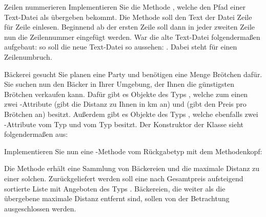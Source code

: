 \documentclass{../tuda-exercise}
\begin{document}
  \begin{task}[credit = \stars{2}{3}]{Zeilen nummerieren}
    Implementieren Sie die Methode , welche den
    Pfad einer Text-Datei als  übergeben bekommt. Die Methode soll den Text
    der Datei Zeile für Zeile einlesen. Beginnend ab der ersten Zeile soll dann in jeder zweiten
    Zeile nun die Zeilennummer eingefügt werden. War die alte Text-Datei folgendermaßen
    aufgebaut: \code{\textcolor{stringcolor}{"'Row1 \(\backslash\)n Row2"'}} so soll die neue
    Text-Datei so aussehen: \code{\textcolor{stringcolor}{"'1 Row1 \(\backslash\)n 2 Row2"'}}. Dabei steht
    \code{\textcolor{stringcolor}{"'\(\backslash\)n"'}} für einen Zeilenumbruch.

    \begin{solution}
      
    \end{solution}
  \end{task}

  \clearpage

  \begin{task}[credit = \stars{3}{3}]{Bäckerei gesucht}
    Sie planen eine Party und benötigen eine Menge Brötchen dafür. Sie suchen nun den Bäcker in
    Ihrer Umgebung, der Ihnen die günstigsten Brötchen verkaufen kann. Dafür gibt es Objekte des
    Typs , welche zum einen zwei -Attribute
     (gibt die Distanz zu Ihnen in km an) und  (gibt den
    Preis pro Brötchen an) besitzt. Außerdem gibt es Objekte des Typs ,
    welche ebenfalls zwei -Attribute  vom Typ
     und  vom Typ  besitzt. Der
    Konstruktor der Klasse sieht folgendermaßen aus:

    

    Implementieren Sie nun eine -Methode vom Rückgabetyp
     mit dem
    Methodenkopf:

    \begin{center}
    \end{center}

    Die Methode erhält eine Sammlung von Bäckereien und die maximale Distanz zu einer solchen.
    Zurückgeliefert werden soll eine nach Gesamtpreis aufsteigend sortierte Liste mit Angeboten
    des Typs . Bäckereien, die weiter als die übergebene maximale Distanz
    entfernt sind, sollen von der Betrachtung ausgeschlossen werden.

    \begin{solution}
      
    \end{solution}
  \end{task}
\end{document}
